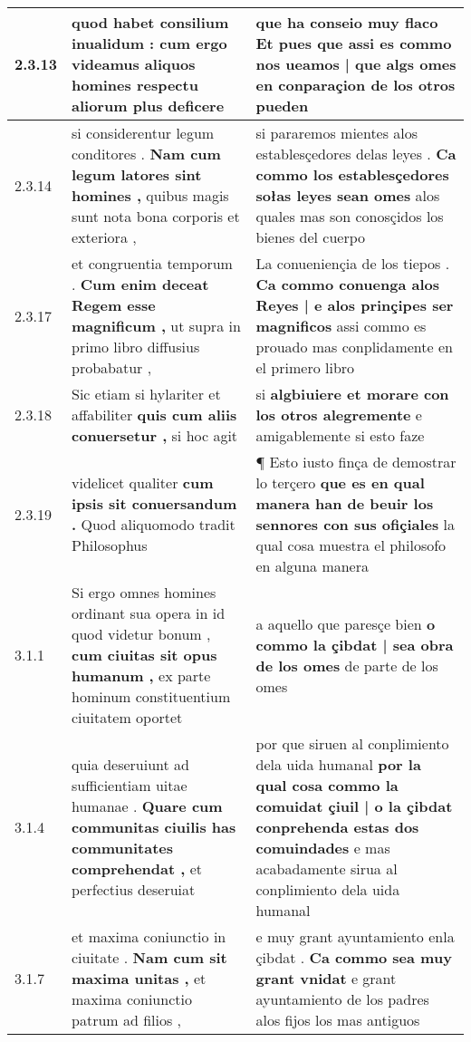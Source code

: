 \begin{tabular}{|p{1cm}|p{6.5cm}|p{6.5cm}|}
2.3.13 & quod habet consilium inualidum : \textbf{ cum ergo videamus aliquos homines respectu aliorum } plus deficere & que ha conseio muy flaco \textbf{ Et pues que assi es commo nos ueamos | que algs omes en conparaçion de los otros } pueden \\\hline
2.3.14 & si considerentur legum conditores . \textbf{ Nam cum legum latores sint homines , } quibus magis sunt nota bona corporis et exteriora , & si pararemos mientes alos establesçedores delas leyes . \textbf{ Ca commo los establesçedores sołas leyes sean omes } alos quales mas son conosçidos los bienes del cuerpo \\\hline
2.3.17 & et congruentia temporum . \textbf{ Cum enim deceat Regem esse magnificum , } ut supra in primo libro diffusius probabatur , & La conueniençia de los tiepos . \textbf{ Ca commo conuenga alos Reyes | e alos prinçipes ser magnificos } assi commo es prouado mas conplidamente en el primero libro \\\hline
2.3.18 & Sic etiam si hylariter et affabiliter \textbf{ quis cum aliis conuersetur , } si hoc agit & si \textbf{ algbiuiere et morare con los otros alegremente } e amigablemente si esto faze \\\hline
2.3.19 & videlicet qualiter \textbf{ cum ipsis sit conuersandum . } Quod aliquomodo tradit Philosophus & ¶ Esto iusto finça de demostrar lo terçero \textbf{ que es en qual manera han de beuir los sennores con sus ofiçiales } la qual cosa muestra el philosofo en alguna manera \\\hline
3.1.1 & Si ergo omnes homines ordinant sua opera in id quod videtur bonum , \textbf{ cum ciuitas sit opus humanum , } ex parte hominum constituentium ciuitatem oportet & a aquello que paresçe bien \textbf{ o commo la çibdat | sea obra de los omes } de parte de los omes \\\hline
3.1.4 & quia deseruiunt ad sufficientiam uitae humanae . \textbf{ Quare cum communitas ciuilis has communitates comprehendat , } et perfectius deseruiat & por que siruen al conplimiento dela uida humanal \textbf{ por la qual cosa commo la comuidat çiuil | o la çibdat conprehenda estas dos comuindades } e mas acabadamente sirua al conplimiento dela uida humanal \\\hline
3.1.7 & et maxima coniunctio in ciuitate . \textbf{ Nam cum sit maxima unitas , } et maxima coniunctio patrum ad filios , & e muy grant ayuntamiento enla çibdat . \textbf{ Ca commo sea muy grant vnidat } e grant ayuntamiento de los padres alos fijos los mas antiguos \\\hline

\end{tabular}
